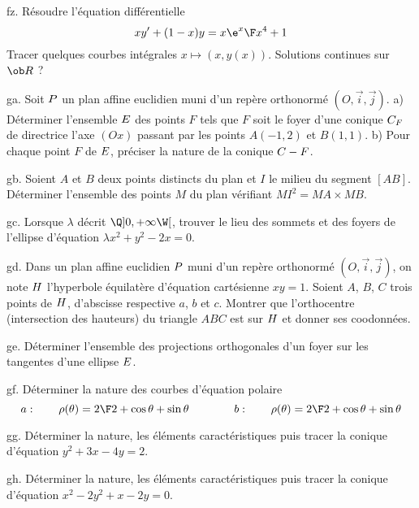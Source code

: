 \exo [Level=1,Fight=1,Learn=1,Field=\EquationsDifférentiellesLinéairesDuPremierOrdre,Type=\Exercices,Origin=] fz. 
Résoudre l'équation différentielle 
$$
xy'+(1-x)y={x\e^x\F x^4+1}
$$
Tracer quelques courbes intégrales $x\mapsto (x,y(x))$. Solutions continues sur $\ob R$ ?

\exo [Level=1,Fight=0,Learn=0,Field=\Coniques,Type=\Exercices,Origin=] ga. 
Soit $\sc P$ un plan affine euclidien muni d'un repère orthonormé $(O,\vec i,\vec j)$. \pn
a) Déterminer l'ensemble $\sc E$ des points $F$ tels que $F$ soit le foyer d'une conique $\sc C_F$ de directrice l'axe $(Ox)$ passant par les points $A(-1,2)$ et $B(1,1)$. \pn
b) Pour chaque point $F$ de $\sc E$, préciser la nature de la conique $\sc C-F$. 

\exo  [Level=1,Fight=0,Learn=0,Field=\GéométriePlane,Type=\Exercices,Origin=] gb. 
Soient $A$ et $B$ deux points distincts du plan et $I$ le milieu du segment $[AB]$. \pn 
Déterminer l'ensemble des points $M$ du plan vérifiant $MI^2=MA\times MB$. 

\exo  [Level=1,Fight=1,Learn=0,Field=\Coniques,Type=\Exercices,Origin=] gc. 
Lorsque $\lambda$ décrit $\Q]0,+\infty\W[$, trouver le lieu des sommets et des foyers de l'ellipse d'équation $\lambda x^2+y^2-2x=0$. 

\exo  [Level=1,Fight=1,Learn=0,Field=\GéométriePlane,Type=\Exercices,Origin=] gd. 
Dans un plan affine euclidien $\sc P$ muni d'un repère orthonormé $(O,\vec i,\vec j)$, on  note $\sc H$ l'hyperbole équilatère d'équation cartésienne $xy=1$. 
Soient $A$, $B$, $C$ trois points de $\sc H$, d'abscisse respective $a$, $b$ et $c$. 
Montrer que l'orthocentre (intersection des hauteurs) du triangle $ABC$ est sur $\sc H$ et donner ses coodonnées. 

\exo  [Level=1,Fight=0,Learn=0,Field=\Coniques,Type=\Exercices,Origin=] ge. 
Déterminer l'ensemble des projections orthogonales d'un foyer sur les tangentes d'une ellipse $\sc E$. 


\exo [Level=1,Fight=1,Learn=0,Field=\CourbesParamétréesPolaires,Type=\Exercices,Origin=] gf. 
Déterminer la nature des courbes d'équation polaire
$$
a:\qquad \rho(\theta)={2\F 2+\cos\theta+\sin\theta}\qquad \qquad b:\qquad \rho(\theta)={2\F 2+\cos\theta+\sin\theta}
$$

\exo  [Level=1,Fight=0,Learn=0,Field=\Coniques,Type=\Exercices,Origin=] gg. 
Déterminer la nature, les éléments caractéristiques puis tracer la conique d'équation $y^2+3x-4y=2$. 

\exo  [Level=1,Fight=0,Learn=0,Field=\Coniques,Type=\Exercices,Origin=] gh. 
Déterminer la nature, les éléments caractéristiques puis tracer la conique d'équation $x^2-2y^2+x-2y=0$. 

